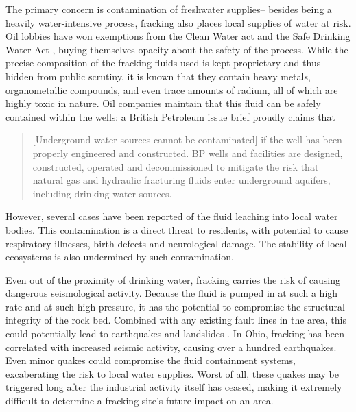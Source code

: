 \documentclass[12pt,letterpaper]{article}
\begin{document}
The primary concern is contamination of freshwater supplies-- besides being a heavily water-intensive process, fracking also places local supplies of water at risk. Oil lobbies have won exemptions from the Clean Water act and the Safe Drinking Water Act \cite[272]{nature}, buying themselves opacity about the safety of the process. While the precise composition of the fracking fluids used is kept proprietary and thus hidden from public scrutiny, it is known that they contain heavy metals, organometallic compounds, and even trace amounts of radium, all of which are highly toxic in nature. Oil companies maintain that this fluid can be safely contained within the wells: a British Petroleum issue brief proudly claims that

\begin{quote}
[Underground water sources cannot be contaminated] if the well has been properly engineered and constructed. BP wells and facilities are designed, constructed, operated and decommissioned to mitigate the risk that natural gas and hydraulic fracturing fluids enter underground aquifers, including drinking water sources. \cite[4]{bp}
\end{quote}

 However, several cases have been reported \cite[272]{nature} of the fluid leaching into local water bodies. This contamination is a direct threat to residents, with potential to cause respiratory illnesses, birth defects and neurological damage. The stability of local ecosystems is also undermined by such contamination. 

Even out of the proximity of drinking water, fracking carries the risk of causing dangerous seismological activity. Because the fluid is pumped in at such a high rate and at such high pressure, it has the potential to compromise the structural integrity of the rock bed. Combined with any existing fault lines in the area, this could potentially lead to earthquakes and landslides \cite{quake}. In Ohio, fracking has been correlated with increased seismic activity, causing over a hundred earthquakes. Even minor quakes could compromise the fluid containment systems, excaberating the risk to local water supplies. Worst of all, these quakes may be triggered long after the industrial activity itself has ceased, making it extremely difficult to determine a fracking site's future impact on an area.
\end{document}
